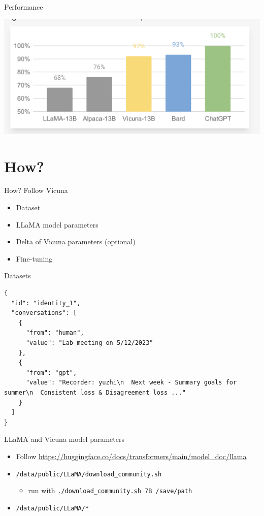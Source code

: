 \documentclass[aspectratio=1610,xcolor={dvipsnames},hyperref={colorlinks,unicode,linkcolor=violet,anchorcolor=BlueViolet,citecolor=YellowOrange,filecolor=black,urlcolor=Aquamarine}]{beamer}
\begin{document}
\begin{frame}[label={sec:orgc226713}]{Performance}
\begin{center}
\includegraphics[width=.9\linewidth]{./chart.png}
\end{center}
\end{frame}

\section{How?}
\label{sec:orgc9fa17d}

\begin{frame}[label={sec:orgaf9c15f}]{How?}
Follow Vicuna

\begin{itemize}
\item Dataset
\item LLaMA model parameters
\item Delta of Vicuna parameters (optional)
\item Fine-tuning
\end{itemize}
\end{frame}

\begin{frame}[label={sec:org496b6eb},fragile]{Datasets}
 \begin{verbatim}
{
  "id": "identity_1",
  "conversations": [
    {
      "from": "human",
      "value": "Lab meeting on 5/12/2023"
    },
    {
      "from": "gpt",
      "value": "Recorder: yuzhi\n  Next week - Summary goals for summer\n  Consistent loss & Disagreement loss ..."
    }
  ]
}
\end{verbatim}
\end{frame}

\begin{frame}[label={sec:orga5b4558},fragile]{LLaMA and Vicuna model parameters}
 \begin{itemize}
\item Follow \url{https://huggingface.co/docs/transformers/main/model\_doc/llama}
\item \texttt{/data/public/LLaMA/download\_community.sh}
\begin{itemize}
\item run with \texttt{./download\_community.sh 7B /save/path}
\end{itemize}
\item \texttt{/data/public/LLaMA/*}
\end{itemize}
\end{frame}
\end{document}
